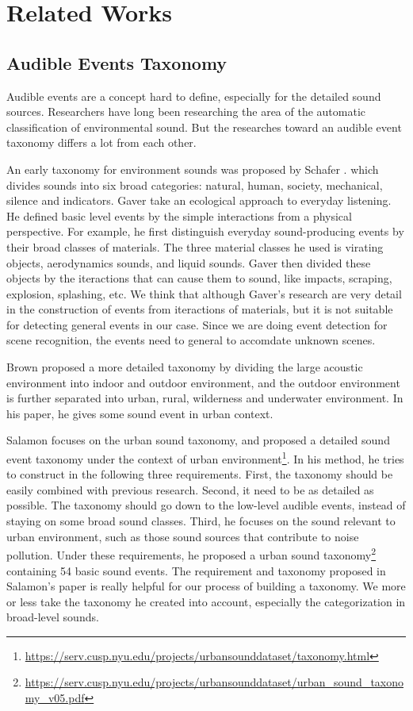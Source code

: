 \chapter{Related Works}
\section{Audible Events Taxonomy}
Audible events are a concept hard to define, especially for the detailed sound sources. 
Researchers have long been researching the area of the automatic classification of environmental sound. 
But the researches toward an audible event taxonomy differs a lot from each other. 

An early taxonomy for environment sounds was proposed by Schafer \cite{schafer1993soundscape}. which divides sounds into six broad categories: natural, human, society, mechanical, silence and indicators. 
Gaver \cite{gaver1993world} take an ecological approach to everyday listening. 
He defined basic level events by the simple interactions from a physical perspective. 
For example, he first distinguish everyday sound-producing events by their broad classes of materials. 
The three material classes he used is virating objects, aerodynamics sounds, and liquid sounds. 
Gaver then divided these objects by the iteractions that can cause them to sound, like impacts, scraping, explosion, splashing, etc. 
We think that although Gaver's research are very detail in the construction of events from iteractions of materials, but it is not suitable for detecting general events in our case. 
Since we are doing event detection for scene recognition, the events need to general to accomdate unknown scenes. 
 
Brown \cite{brown2011towards} proposed a more detailed taxonomy by dividing the large acoustic environment into indoor and outdoor environment, and the outdoor environment is further separated into urban, rural, wilderness and underwater environment. 
In his paper, he gives some sound event in urban context.

Salamon \cite{salamon2014dataset} focuses on the urban sound taxonomy, and proposed a detailed sound event taxonomy under the context of urban environment\footnote{\url{https://serv.cusp.nyu.edu/projects/urbansounddataset/taxonomy.html}}. 
In his method, he tries to construct in the following three requirements. 
First, the taxonomy should be easily combined with previous research.
Second, it need to be as detailed as possible. 
The taxonomy should go down to the low-level audible events, instead of staying on some broad sound classes. 
Third, he focuses on the sound relevant to urban environment, such as those sound sources that contribute to noise pollution. 
Under these requirements, he proposed a urban sound taxonomy\footnote{\url{https://serv.cusp.nyu.edu/projects/urbansounddataset/urban\_sound\_taxonomy\_v05.pdf}} containing 54 basic sound events. 
The requirement and taxonomy proposed in Salamon's paper is really helpful for our process of building a taxonomy. 
We more or less take the taxonomy he created into account, especially the categorization in broad-level sounds. 

